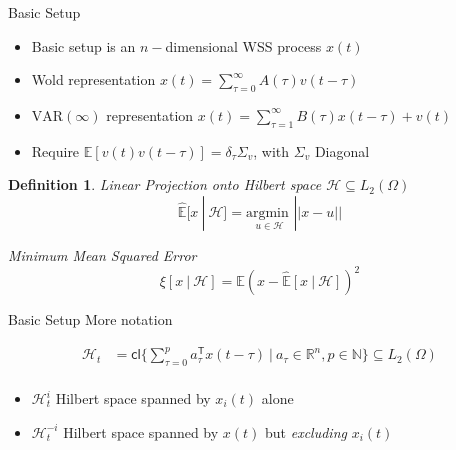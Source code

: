 \documentclass{beamer} %
\newtheorem*{defn}{Definition}
\def\E{\mathbb{E}}  %
\def\H{\mathcal{H}}  %
\def\R{\mathbb{R}}  %
\def\N{\mathbb{N}}  %
\def\T{\mathsf{T}}  %
\def\cl{\mathsf{cl}}  %
\newcommand{\linE}[2]{\hat{\E}[#1\ |\ #2]}  %
\begin{document}
\begin{frame}{Basic Setup}
  \begin{itemize}
    \item{Basic setup is an $n-$dimensional WSS process $x(t)$}\pause
    \item{Wold representation $x(t) = \sum_{\tau = 0}^\infty A(\tau)v(t - \tau)$}\pause
    \item{$\text{VAR}(\infty)$ representation $x(t) = \sum_{\tau = 1}^\infty B(\tau)x(t - \tau) + v(t)$}\pause
    \item{Require $\E[v(t)v(t - \tau)] = \delta_{\tau}\Sigma_v$, with $\Sigma_v$ Diagonal}\pause
  \end{itemize}

  \begin{defn}
    Linear Projection onto Hilbert space $\H \subseteq L_2(\Omega)$
    \begin{equation*}
      \linE{x}{\H} = \underset{u \in \H}{\text{argmin }} ||x - u||
    \end{equation*}

    Minimum Mean Squared Error
    \begin{equation*}
      \xi[x \ |\ \H] = \E (x - \linE{x}{\H})^2      
    \end{equation*}
  \end{defn}
\end{frame}

\begin{frame}{Basic Setup}
  More notation

  \begin{align*}
    \H_t &= \cl \{\sum_{\tau = 0}^p a_\tau^\T x(t - \tau)\ |\ a_\tau \in \R^n, p \in \N\} \subseteq L_2(\Omega)\\
  \end{align*}\pause

  \begin{itemize}
    \item{$\H_t^{i}$ Hilbert space spanned by $x_i(t)$ alone}
    \item{$\H_t^{-i}$ Hilbert space spanned by $x(t)$ but \textit{excluding} $x_i(t)$}
  \end{itemize}
\end{frame}
\end{document}
